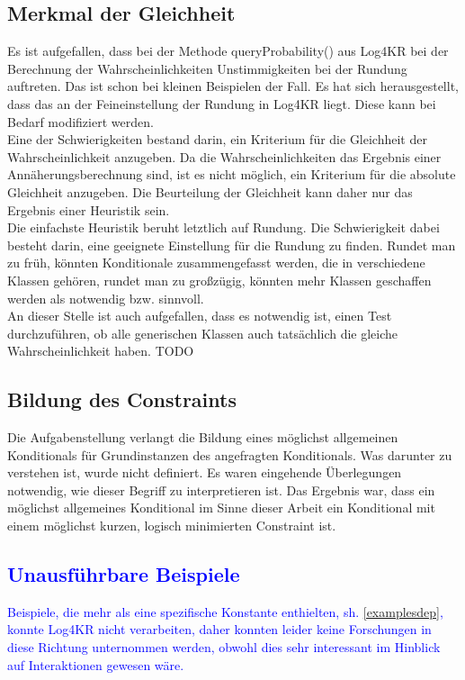 \documentclass[a4paper, 11pt]{book}
\begin{document}
\subsection{Merkmal der Gleichheit} \label{Gleichheit}
Es ist aufgefallen, dass bei der Methode queryProbability() aus Log4KR bei der Berechnung der Wahrscheinlichkeiten Unstimmigkeiten bei der Rundung auftreten. Das ist schon bei kleinen Beispielen der Fall. Es hat sich herausgestellt, dass das an der Feineinstellung der Rundung in Log4KR liegt. Diese kann bei Bedarf modifiziert werden.\\
Eine der Schwierigkeiten bestand darin, ein Kriterium für die Gleichheit der Wahrscheinlichkeit anzugeben. Da die Wahrscheinlichkeiten das Ergebnis einer Annäherungsberechnung sind, ist es nicht möglich, ein Kriterium für die absolute Gleichheit anzugeben. Die Beurteilung der Gleichheit kann daher nur das Ergebnis einer Heuristik sein.\\
Die einfachste Heuristik beruht letztlich auf Rundung. Die Schwierigkeit dabei besteht darin, eine geeignete Einstellung für die Rundung zu finden. Rundet man zu früh, könnten Konditionale zusammengefasst werden, die in verschiedene Klassen gehören, rundet man zu großzügig, könnten mehr Klassen geschaffen werden als notwendig bzw. sinnvoll.\\
An dieser Stelle ist auch aufgefallen, dass es notwendig ist, einen Test durchzuführen, ob alle generischen Klassen auch tatsächlich die gleiche Wahrscheinlichkeit haben. TODO

\subsection{Bildung des Constraints}
Die Aufgabenstellung verlangt die Bildung eines möglichst allgemeinen Konditionals für Grundinstanzen des angefragten Konditionals. Was darunter zu verstehen ist, wurde nicht definiert. Es waren eingehende Überlegungen notwendig, wie dieser Begriff zu interpretieren ist. Das Ergebnis war, dass ein möglichst allgemeines Konditional im Sinne dieser Arbeit ein Konditional mit einem möglichst kurzen, logisch minimierten Constraint ist.

\textcolor{blue}{
\subsection{Unausführbare Beispiele} \label{Beispiele unausfuehrbar} 
Beispiele, die mehr als eine spezifische Konstante enthielten, sh. \ref{examplesdep}, konnte Log4KR nicht verarbeiten, daher konnten leider keine Forschungen in diese Richtung unternommen werden, obwohl dies sehr interessant im Hinblick auf Interaktionen gewesen wäre. 
}
\end{document}
